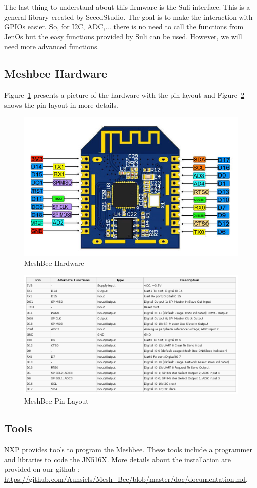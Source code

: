 The last thing to understand about this firmware is the Suli interface. This is a general library created by SeeedStudio. The goal is to make the interaction with GPIOs easier. So, for I2C, ADC,... there is no need to call the functions from JenOs but the easy functions provided by Suli can be used. However, we will need more advanced functions.

\subsection{Meshbee Hardware}

Figure~\ref{f:600px-Mesh_Bee_Pin} presents a picture of the hardware with the pin layout and Figure~\ref{f:pin_dispo} shows the pin layout in more details.

\begin{figure}[ht]
\centering
\includegraphics[width=.6\linewidth]{600px-Mesh_Bee_Pin}
\caption[MeshBee Hardware]{\label{f:600px-Mesh_Bee_Pin}MeshBee Hardware}
\end{figure}

\begin{figure}[ht]
\centering
\includegraphics[width=.6\linewidth]{pin_dispo}
\caption[MeshBee Pin Layout]{\label{f:pin_dispo}MeshBee Pin Layout}
\end{figure}

\subsection{Tools}

NXP provides tools to program the Meshbee. These tools include a programmer and libraries to code the JN516X. More details about the installation are provided on our github : \url{https://github.com/Aunsiels/Mesh_Bee/blob/master/doc/documentation.md}.

